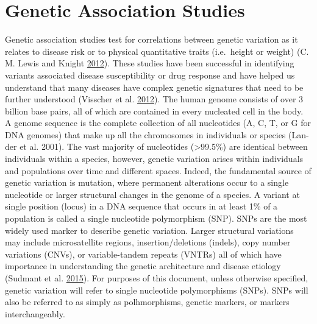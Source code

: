 \documentclass[]{DissertateOSU}
\begin{document}
\section{Genetic Association Studies}\label{genetic-association-studies}

Genetic association studies test for correlations between genetic
variation as it relates to disease risk or to physical quantitative
traits (i.e.~height or weight) (C. M. Lewis and Knight
\protect\hyperlink{ref-Lewis_2012}{2012}). These studies have been
successful in identifying variants associated disease susceptibility or
drug response and have helped us understand that many diseases have
complex genetic signatures that need to be further understood (Visscher
et al. \protect\hyperlink{ref-Visscher_2012}{2012}). The human genome
consists of over 3 billion base pairs, all of which are contained in
every nucleated cell in the body. A genome sequence is the complete
collection of all nucleotides (A, C, T, or G for DNA genomes) that make
up all the chromosomes in individuals or species (Lan- der et al. 2001).
The vast majority of nucleotides (\textgreater{}99.5\%) are identical
between individuals within a species, however, genetic variation arises
within individuals and populations over time and different spaces.
Indeed, the fundamental source of genetic variation is mutation, where
permanent alterations occur to a single nucleotide or larger structural
changes in the genome of a species. A variant at single position (locus)
in a DNA sequence that occurs in at least 1\% of a population is called
a single nucleotide polymorphism (SNP). SNPs are the most widely used
marker to describe genetic variation. Larger structural variations may
include microsatellite regions, insertion/deletions (indels), copy
number variations (CNVs), or variable-tandem repeats (VNTRs) all of
which have importance in understanding the genetic architecture and
disease etiology (Sudmant et al.
\protect\hyperlink{ref-Sudmant_2015}{2015}). For purposes of this
document, unless otherwise specified, genetic variation will refer to
single nucleotide polymorphisms (SNPs). SNPs will also be referred to as
simply as polhmorphisms, genetic markers, or markers interchangeably.
\end{document}
